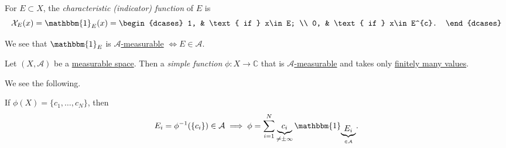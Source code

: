 \begin{definition}\label{def:characteristic-function}
	For \(E\subset X\), the \emph{characteristic (indicator) function} of \(E\) is
	\[
		\mathcal{X} _E (x)= \mathbbm{1}_{E}(x) = \begin{dcases}
			1, & \text{ if }  x\in E;     \\
			0, & \text{ if }  x\in E^{c}.
		\end{dcases}
	\]
\end{definition}
\begin{remark}
	We see that \(\mathbbm{1}_{ E}\) is \hyperref[def:A-measurable-function]{\(\mathcal{A}\)-measurable} \(\iff E\in\mathcal{A}\).
\end{remark}

\begin{definition}\label{def:simple-function}
	Let \((X, \mathcal{A} )\) be a \hyperref[def:measurable-space]{measurable space}. Then a \emph{simple function} \(\phi \colon X\to \mathbb{C} \) that
	is \hyperref[def:A-measurable-function]{\(\mathcal{A} \)-measurable} and takes only \underline{finitely many values}.
\end{definition}

We see the following.

\begin{remark}
	If \(\phi (X) = \{c_1, \dots , c_N \}\), then
	\[
		E_{i}= \phi ^{-1} (\{c_{i}\})\in \mathcal{A} \implies \phi = \sum_{i=1}^{N} \underbrace{c_{i}}_{\neq \pm \infty }\mathbbm{1}_{\underbrace{E_{i}}_{\in \mathcal{A}}}.
	\]
\end{remark}